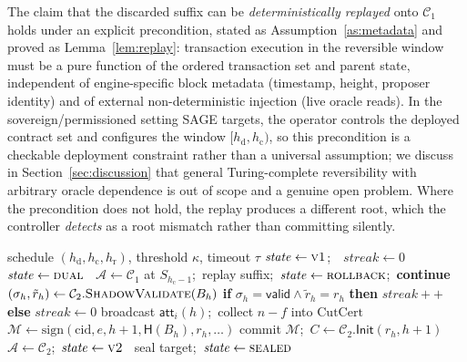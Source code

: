 \documentclass[journal]{IEEEtran}
\theoremstyle{remark}
\begin{document}
The claim that the discarded suffix can be \emph{deterministically replayed} onto $\mathcal{C}_1$
holds under an explicit precondition, stated as Assumption~\ref{as:metadata} and proved as
Lemma~\ref{lem:replay}: transaction execution in the reversible window must be a pure function of
the ordered transaction set and parent state, independent of engine-specific block metadata
(timestamp, height, proposer identity) and of external non-deterministic injection (live oracle
reads). In the sovereign/permissioned setting SAGE targets, the operator controls the deployed
contract set and configures the window $[h_{\mathrm{d}}, h_{\mathrm{c}})$, so this precondition is a
checkable deployment constraint rather than a universal assumption; we discuss in
Section~\ref{sec:discussion} that general Turing-complete reversibility with arbitrary oracle
dependence is out of scope and a genuine open problem. Where the precondition does not hold, the
replay produces a different root, which the controller \emph{detects} as a root mismatch rather than
committing silently.

\begin{algorithm}[t]
\caption{SAGE per-height controller at a correct validator}
\label{alg:sage}
\begin{algorithmic}[1]
\Require schedule $(h_{\mathrm{d}}, h_{\mathrm{c}}, h_{\mathrm{r}})$, threshold $\kappa$, timeout $\tau$
\State $\mathit{state} \gets \textsc{v1}$;\ \ $\mathit{streak} \gets 0$
  \ $\mathit{state}\gets\textsc{dual}$\ \EndIf
     \State $\mathcal{A}\gets\mathcal{C}_1$ at $S_{h_{\mathrm{c}}-1}$;\ replay suffix;\ $\mathit{state}\gets\textsc{rollback}$;\ \textbf{continue}
  \EndIf
     \State $(\sigma_h,\tilde r_h)\gets\mathcal{C}_2.\textsc{ShadowValidate}(B_h)$
     \State \textbf{if} $\sigma_h{=}\mathsf{valid}\wedge\tilde r_h{=}r_h$ \textbf{then} $\mathit{streak}{+}{+}$ \textbf{else} $\mathit{streak}\gets 0$
        \State broadcast $\mathsf{att}_i(h)$;\ collect $n{-}f$ into $\mathrm{CutCert}$
           \State $\mathcal{M}\gets\mathrm{sign}(\mathrm{cid},e,h{+}1,\mathsf{H}(B_h),r_h,\ldots)$
           \State commit $\mathcal{M}$;\ $C\gets\mathcal{C}_2.\mathsf{Init}(r_h,h{+}1)$
           \State $\mathcal{A}\gets\mathcal{C}_2$;\ $\mathit{state}\gets\textsc{v2}$
        \EndIf
     \EndIf
  \EndIf
  \ seal target;\ $\mathit{state}\gets\textsc{sealed}$ \EndIf
\EndFor
\end{algorithmic}
\end{algorithm}
\end{document}
